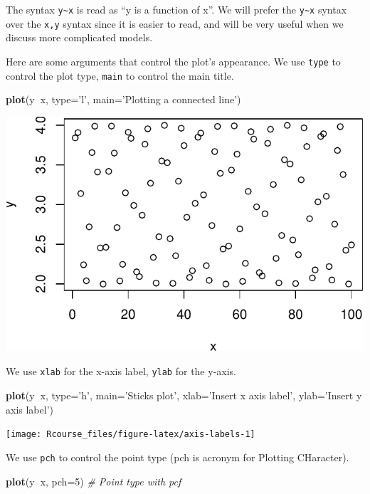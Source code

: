 \documentclass[]{book}
\newenvironment{Shaded}{\begin{snugshade}}{\end{snugshade}}
\newcommand{\CommentTok}[1]{\textcolor[rgb]{0.56,0.35,0.01}{\textit{#1}}}
\newcommand{\DataTypeTok}[1]{\textcolor[rgb]{0.13,0.29,0.53}{#1}}
\newcommand{\DecValTok}[1]{\textcolor[rgb]{0.00,0.00,0.81}{#1}}
\newcommand{\KeywordTok}[1]{\textcolor[rgb]{0.13,0.29,0.53}{\textbf{#1}}}
\newcommand{\NormalTok}[1]{#1}
\newcommand{\OperatorTok}[1]{\textcolor[rgb]{0.81,0.36,0.00}{\textbf{#1}}}
\newcommand{\StringTok}[1]{\textcolor[rgb]{0.31,0.60,0.02}{#1}}
\theoremstyle{definition}
\theoremstyle{definition}
\theoremstyle{definition}
\theoremstyle{remark}
\begin{document}
The syntax \texttt{y\textasciitilde{}x} is read as ``y is a function of x''.
We will prefer the \texttt{y\textasciitilde{}x} syntax over the \texttt{x,y} syntax since it is easier to read, and will be very useful when we discuss more complicated models.

Here are some arguments that control the plot's appearance.
We use \texttt{type} to control the plot type, \texttt{main} to control the main title.

\begin{Shaded}
\begin{Highlighting}[]
\KeywordTok{plot}\NormalTok{(y}\OperatorTok{~}\NormalTok{x, }\DataTypeTok{type=}\StringTok{'l'}\NormalTok{, }\DataTypeTok{main=}\StringTok{'Plotting a connected line'}\NormalTok{) }
\end{Highlighting}
\end{Shaded}

\includegraphics[width=0.5\linewidth]{Rcourse_files/figure-latex/unnamed-chunk-33-1}

We use \texttt{xlab} for the x-axis label, \texttt{ylab} for the y-axis.

\begin{Shaded}
\begin{Highlighting}[]
\KeywordTok{plot}\NormalTok{(y}\OperatorTok{~}\NormalTok{x, }\DataTypeTok{type=}\StringTok{'h'}\NormalTok{, }\DataTypeTok{main=}\StringTok{'Sticks plot'}\NormalTok{, }\DataTypeTok{xlab=}\StringTok{'Insert x axis label'}\NormalTok{, }\DataTypeTok{ylab=}\StringTok{'Insert y axis label'}\NormalTok{) }
\end{Highlighting}
\end{Shaded}

\texttt{[image: Rcourse\_files/figure-latex/axis-labels-1]}

We use \texttt{pch} to control the point type (pch is acronym for Plotting CHaracter).

\begin{Shaded}
\begin{Highlighting}[]
\KeywordTok{plot}\NormalTok{(y}\OperatorTok{~}\NormalTok{x, }\DataTypeTok{pch=}\DecValTok{5}\NormalTok{) }\CommentTok{# Point type with pcf}
\end{Highlighting}
\end{Shaded}
\end{document}
